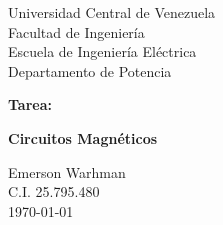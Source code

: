 \begin{titlepage}
    \centering
    \Large
    Universidad Central de Venezuela\\
    Facultad de Ingeniería\\
    Escuela de Ingeniería Eléctrica\\
    Departamento de Potencia
    \vspace*{8cm}

    \Huge
    \textbf{Tarea:}

    \textbf{Circuitos Magnéticos}
    \vfill

    \Large

    Emerson Warhman \\
    C.I. 25.795.480 \\
    \today

\end{titlepage}

